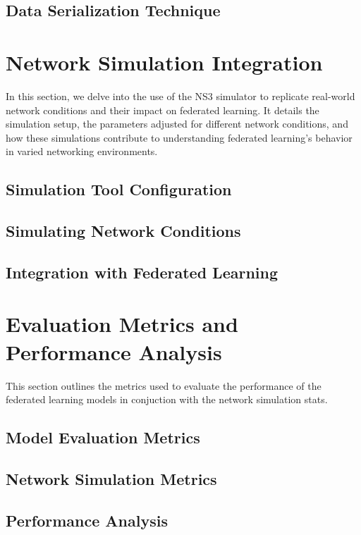 \subsection{Data Serialization Technique}

\section{Network Simulation Integration}
In this section, we delve into the use of the NS3 simulator to replicate real-world network conditions and their impact
on federated learning. It details the simulation setup, the parameters adjusted for different network conditions, and
how these simulations contribute to understanding federated learning's behavior in varied networking environments.

\subsection{Simulation Tool Configuration}
\subsection{Simulating Network Conditions}
\subsection{Integration with Federated Learning}

\section{Evaluation Metrics and Performance Analysis}
This section outlines the metrics used to evaluate the performance of the federated learning models in conjuction with
the network simulation stats.

\subsection{Model Evaluation Metrics}
\subsection{Network Simulation Metrics}
\subsection{Performance Analysis}
